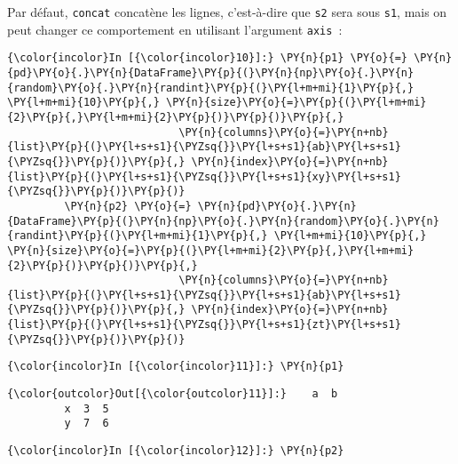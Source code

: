     Par défaut, \texttt{concat} concatène les lignes, c'est-à-dire que
\texttt{s2} sera sous \texttt{s1}, mais on peut changer ce comportement
en utilisant l'argument \texttt{axis}~:

    \begin{Verbatim}[commandchars=\\\{\},frame=single,framerule=0.3mm,rulecolor=\color{cellframecolor}]
{\color{incolor}In [{\color{incolor}10}]:} \PY{n}{p1} \PY{o}{=} \PY{n}{pd}\PY{o}{.}\PY{n}{DataFrame}\PY{p}{(}\PY{n}{np}\PY{o}{.}\PY{n}{random}\PY{o}{.}\PY{n}{randint}\PY{p}{(}\PY{l+m+mi}{1}\PY{p}{,} \PY{l+m+mi}{10}\PY{p}{,} \PY{n}{size}\PY{o}{=}\PY{p}{(}\PY{l+m+mi}{2}\PY{p}{,}\PY{l+m+mi}{2}\PY{p}{)}\PY{p}{)}\PY{p}{,}
                           \PY{n}{columns}\PY{o}{=}\PY{n+nb}{list}\PY{p}{(}\PY{l+s+s1}{\PYZsq{}}\PY{l+s+s1}{ab}\PY{l+s+s1}{\PYZsq{}}\PY{p}{)}\PY{p}{,} \PY{n}{index}\PY{o}{=}\PY{n+nb}{list}\PY{p}{(}\PY{l+s+s1}{\PYZsq{}}\PY{l+s+s1}{xy}\PY{l+s+s1}{\PYZsq{}}\PY{p}{)}\PY{p}{)}
         \PY{n}{p2} \PY{o}{=} \PY{n}{pd}\PY{o}{.}\PY{n}{DataFrame}\PY{p}{(}\PY{n}{np}\PY{o}{.}\PY{n}{random}\PY{o}{.}\PY{n}{randint}\PY{p}{(}\PY{l+m+mi}{1}\PY{p}{,} \PY{l+m+mi}{10}\PY{p}{,} \PY{n}{size}\PY{o}{=}\PY{p}{(}\PY{l+m+mi}{2}\PY{p}{,}\PY{l+m+mi}{2}\PY{p}{)}\PY{p}{)}\PY{p}{,}
                           \PY{n}{columns}\PY{o}{=}\PY{n+nb}{list}\PY{p}{(}\PY{l+s+s1}{\PYZsq{}}\PY{l+s+s1}{ab}\PY{l+s+s1}{\PYZsq{}}\PY{p}{)}\PY{p}{,} \PY{n}{index}\PY{o}{=}\PY{n+nb}{list}\PY{p}{(}\PY{l+s+s1}{\PYZsq{}}\PY{l+s+s1}{zt}\PY{l+s+s1}{\PYZsq{}}\PY{p}{)}\PY{p}{)}
\end{Verbatim}


    \begin{Verbatim}[commandchars=\\\{\},frame=single,framerule=0.3mm,rulecolor=\color{cellframecolor}]
{\color{incolor}In [{\color{incolor}11}]:} \PY{n}{p1}
\end{Verbatim}


\begin{Verbatim}[commandchars=\\\{\},frame=single,framerule=0.3mm,rulecolor=\color{cellframecolor}]
{\color{outcolor}Out[{\color{outcolor}11}]:}    a  b
         x  3  5
         y  7  6
\end{Verbatim}
            
    \begin{Verbatim}[commandchars=\\\{\},frame=single,framerule=0.3mm,rulecolor=\color{cellframecolor}]
{\color{incolor}In [{\color{incolor}12}]:} \PY{n}{p2}
\end{Verbatim}


